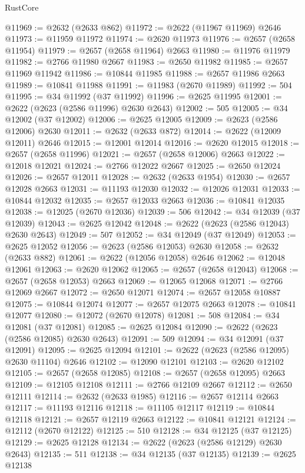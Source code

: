 \begin{lexlean}{RustCore}
\begin{coremodule}
@11969 := @2632 (@2633 @862)
@11972 := @2622 (@11967 @11969) @2646
@11973 := @11959 @11972
@11974 := @2620 @11973
@11976 := @2657 (@2658 @11954)
@11979 := @2657 (@2658 @11964) @2663
@11980 := @11976 @11979
@11982 := @2766 @11980 @2667
@11983 := @2650 @11982
@11985 := @2657 @11969 @11942
@11986 := @10844 @11985
@11988 := @2657 @11986 @2663
@11989 := @10841 @11988
@11991 := @11983 (@2670 @11989)
@11992 := 504
@11995 := @34 @11992 (@37 @11992)
@11996 := @2625 @11995
@12001 := @2622 (@2623 (@2586 @11996) @2630 @2643)
@12002 := 505
@12005 := @34 @12002 (@37 @12002)
@12006 := @2625 @12005
@12009 := @2623 (@2586 @12006) @2630
@12011 := @2632 (@2633 @872)
@12014 := @2622 (@12009 @12011) @2646
@12015 := @12001 @12014
@12016 := @2620 @12015
@12018 := @2657 (@2658 @11996)
@12021 := @2657 (@2658 @12006) @2663
@12022 := @12018 @12021
@12024 := @2766 @12022 @2667
@12025 := @2650 @12024
@12026 := @2657 @12011
@12028 := @2632 (@2633 @1954)
@12030 := @2657 @12028 @2663
@12031 := @11193 @12030
@12032 := @12026 @12031
@12033 := @10844 @12032
@12035 := @2657 @12033 @2663
@12036 := @10841 @12035
@12038 := @12025 (@2670 @12036)
@12039 := 506
@12042 := @34 @12039 (@37 @12039)
@12043 := @2625 @12042
@12048 := @2622 (@2623 (@2586 @12043) @2630 @2643)
@12049 := 507
@12052 := @34 @12049 (@37 @12049)
@12053 := @2625 @12052
@12056 := @2623 (@2586 @12053) @2630
@12058 := @2632 (@2633 @882)
@12061 := @2622 (@12056 @12058) @2646
@12062 := @12048 @12061
@12063 := @2620 @12062
@12065 := @2657 (@2658 @12043)
@12068 := @2657 (@2658 @12053) @2663
@12069 := @12065 @12068
@12071 := @2766 @12069 @2667
@12072 := @2650 @12071
@12074 := @2657 @12058 @10887
@12075 := @10844 @12074
@12077 := @2657 @12075 @2663
@12078 := @10841 @12077
@12080 := @12072 (@2670 @12078)
@12081 := 508
@12084 := @34 @12081 (@37 @12081)
@12085 := @2625 @12084
@12090 := @2622 (@2623 (@2586 @12085) @2630 @2643)
@12091 := 509
@12094 := @34 @12091 (@37 @12091)
@12095 := @2625 @12094
@12101 := @2622 (@2623 (@2586 @12095) @2630 @11104) @2646
@12102 := @12090 @12101
@12103 := @2620 @12102
@12105 := @2657 (@2658 @12085)
@12108 := @2657 (@2658 @12095) @2663
@12109 := @12105 @12108
@12111 := @2766 @12109 @2667
@12112 := @2650 @12111
@12114 := @2632 (@2633 @1985)
@12116 := @2657 @12114 @2663
@12117 := @11193 @12116
@12118 := @11105 @12117
@12119 := @10844 @12118
@12121 := @2657 @12119 @2663
@12122 := @10841 @12121
@12124 := @12112 (@2670 @12122)
@12125 := 510
@12128 := @34 @12125 (@37 @12125)
@12129 := @2625 @12128
@12134 := @2622 (@2623 (@2586 @12129) @2630 @2643)
@12135 := 511
@12138 := @34 @12135 (@37 @12135)
@12139 := @2625 @12138

\end{coremodule}
\end{lexlean}
